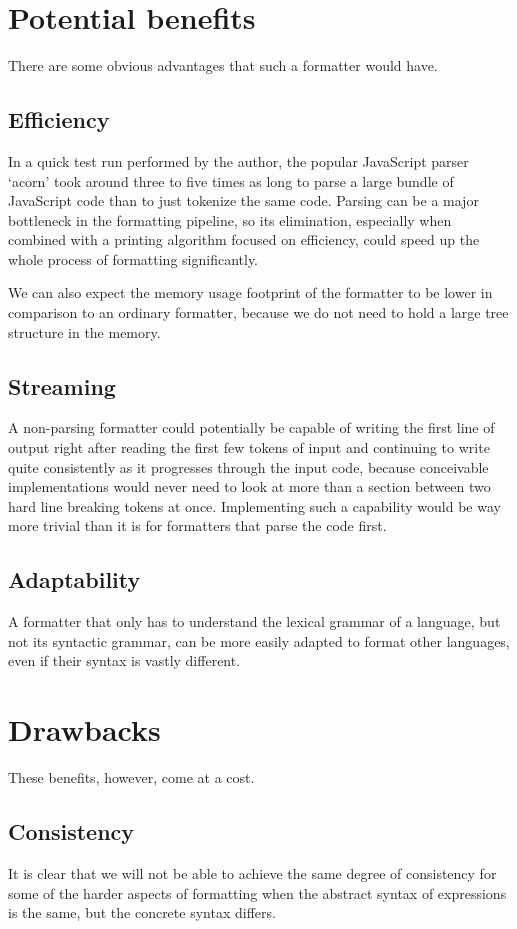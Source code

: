 \section{Potential benefits}
There are some obvious advantages that such a formatter would have.

\subsection{Efficiency}
In a quick test run performed by the author, the popular JavaScript parser `acorn'
took around three to five times as long to parse a large bundle of JavaScript code
than to just tokenize the same code.
Parsing can be a major bottleneck in the formatting pipeline,
so its elimination, especially when combined with a printing algorithm focused on efficiency,
could speed up the whole process of formatting significantly.

We can also expect the memory usage footprint of the formatter
to be lower in comparison to an ordinary formatter,
because we do not need to hold a large tree structure in the memory.

\subsection{Streaming}
A non-parsing formatter could potentially be capable of writing the first line of output
right after reading the first few tokens of input and continuing to write quite consistently
as it progresses through the input code, because conceivable implementations would never
need to look at more than a section between two hard line breaking tokens at once.
Implementing such a capability would be way more trivial than it is for
formatters that parse the code first.

\subsection{Adaptability}
A formatter that only has to understand the lexical grammar of a language,
but not its syntactic grammar, can be more easily adapted to format other languages,
even if their syntax is vastly different.

\section{Drawbacks}
These benefits, however, come at a cost.

\subsection{Consistency}
It is clear that we will not be able to achieve the same degree of consistency
for some of the harder aspects of formatting
when the abstract syntax of expressions is the same,
but the concrete syntax differs.

